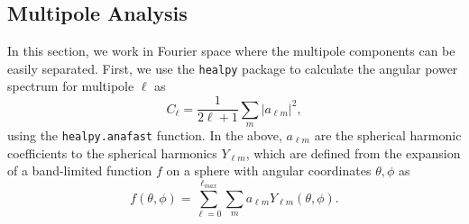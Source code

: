 \documentclass[fleqn,usenatbib]{mnras}
\begin{document}
{\subsection{Multipole Analysis}
\label{sec:sim_results}
 
{In this section,} we %
{work in} Fourier space where the multipole components can be easily separated. First, we use the {\tt healpy} package \citep{healpy1,healpy2} to calculate the angular power spectrum {for multipole $\ell$ as}
\begin{equation}
	\label{eq: angular power spectrum}
    {C_\ell } = \frac{1}{2 \ell +1} \sum_{m} |{{a}_{\ell m}}|^2,
\end{equation}
{using the {\tt healpy.anafast} function.}
{In the above, }$a_{\ell m}$ are the spherical harmonic coefficients to {the} spherical harmonics $Y_{\ell m }$, {which are} defined from the expansion of a band-limited function {$f$} on a sphere with angular coordinates $\theta, \phi$ as  
\begin{equation}
    \label{eq: spherical harmonics}
    f(\theta, \phi) = \sum^{\ell_{max}}_{\ell = 0}\sum_m a_{\ell m} Y_{\ell m }(\theta, \phi).
\end{equation}


}
\end{document}
